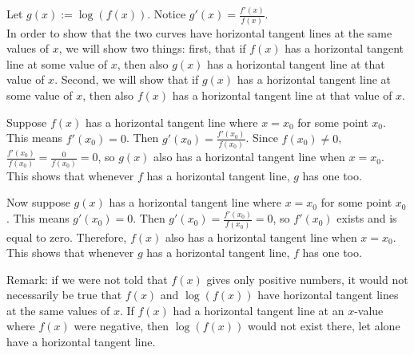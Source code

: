 \begin{solution}
Let $g(x):=\log(f(x))$. Notice $g'(x)=\frac{f'(x)}{f(x)}$.\\

In order to show that the two curves have horizontal tangent lines at the same values of $x$, we will show two things: first, that if $f(x)$ has a horizontal tangent line at some
value of $x$, then also $g(x)$ has a horizontal tangent line at that value of $x$.
Second, we will show that if $g(x)$ has a horizontal tangent line at some
value of $x$, then also $f(x)$ has a horizontal tangent line at that value of $x$.

Suppose $f(x)$ has a horizontal tangent line where $x=x_0$ for some point $x_0$. This means $f'(x_0)=0$. Then $g'(x_0)=\frac{f'(x_0)}{f(x_0)}$. Since $f(x_0) \neq 0$, $\frac{f'(x_0)}{f(x_0)}=\frac{0}{f(x_0)}=0$, so $g(x)$ also has a horizontal tangent line when $x=x_0$. This shows that whenever $f$ has a horizontal tangent line, $g$ has one too.

Now suppose $g(x)$ has a horizontal tangent line where $x=x_0$ for some point $x_0$. This means $g'(x_0)=0$. Then $g'(x_0)=\frac{f'(x_0)}{f(x_0)}=0$,
so $f'(x_0)$ exists and is equal to zero.
Therefore, $f(x)$ also has a horizontal tangent line when $x=x_0$. This shows that whenever $g$ has a horizontal tangent line, $f$ has one too.

Remark: if we were not told that $f(x)$ gives only positive numbers, it would not necessarily be true that $f(x)$ and $\log(f(x))$ have horizontal tangent lines at the same values of $x$. If $f(x)$ had a horizontal tangent line at an $x$-value where $f(x)$ were negative, then $\log(f(x))$ would not exist there, let alone have a horizontal tangent line.
\end{solution}
